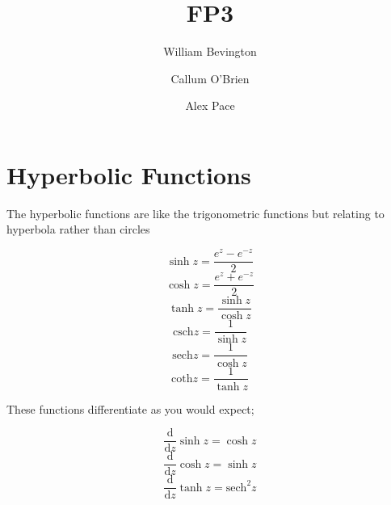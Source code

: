 \documentclass{article}
\title{FP3}
\author{William Bevington \and Callum O'Brien \and Alex Pace}
\begin{document}
\maketitle
\tableofcontents
\newpage

\section{Hyperbolic Functions}

The hyperbolic functions are like the trigonometric functions but relating to hyperbola rather than circles

\[\sinh z=\frac{e^z-e^{-z}}{2}\]
\[\cosh z=\frac{e^z+e^{-z}}{2}\]
\[\tanh z=\frac{\sinh z}{\cosh z}\]
\[\textrm{csch} z=\frac{1}{\sinh z}\]
\[\textrm{sech} z=\frac{1}{\cosh z}\]
\[\textrm{coth} z=\frac{1}{\tanh z}\]

\noident These functions differentiate as you would expect;

\[\frac{\textrm{d}}{\textrm{d}z}\sinh z=\cosh z\]
\[\frac{\textrm{d}}{\textrm{d}z}\cosh z=\sinh z\]
\[\frac{\textrm{d}}{\textrm{d}z}\tanh z=\textrm{sech}^2 z\]
\end{document}
